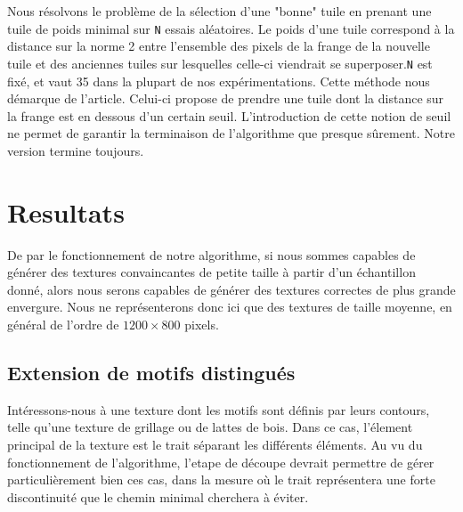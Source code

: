 \documentclass{article}
\begin{document}
Nous résolvons le problème de la sélection d'une "bonne" tuile en prenant une tuile de poids minimal sur \texttt{N} essais aléatoires. Le poids d'une tuile correspond à la distance sur la norme 2 entre l'ensemble des pixels de la frange de la nouvelle tuile et des anciennes tuiles sur lesquelles celle-ci viendrait se superposer.\texttt{N} est fixé, et vaut 35 dans la plupart de nos expérimentations. 
Cette méthode nous démarque de l'article. Celui-ci propose de prendre une tuile dont la distance sur la frange est en dessous d'un certain seuil. L'introduction de cette notion de seuil ne permet de garantir la terminaison de l'algorithme que presque sûrement. Notre version termine toujours. 



% 
% 

\section{Resultats}

	De par le fonctionnement de notre algorithme, si nous sommes capables de générer des textures convaincantes de petite taille à partir d'un échantillon donné, alors nous serons capables de générer des textures correctes de plus grande envergure. Nous ne représenterons donc ici que des textures de taille moyenne, en général de l'ordre de $1200\times800$ pixels. 


\subsection{Extension de motifs distingués}
Intéressons-nous à une texture dont les motifs sont définis par leurs contours, telle qu'une texture de grillage ou de lattes de bois. Dans ce cas, l'élement principal de la texture est le trait séparant les différents éléments. Au vu du fonctionnement de l'algorithme, l'etape de découpe devrait permettre de gérer particulièrement bien ces cas, dans la mesure où le trait représentera une forte discontinuité que le chemin minimal cherchera à éviter. 
\end{document}

